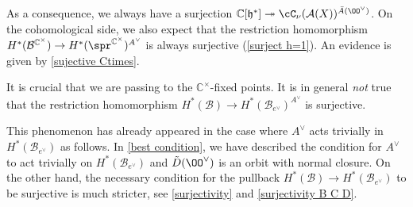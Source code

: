 \documentclass[12pt]{amsart}
\begin{document}
    As a consequence, we always have a surjection $\mathbb{C}[\mathfrak{h}^*] \twoheadrightarrow \cC_\nu(\mathcal{A}(X))^{\Bar{A}(\OO^\vee)}$. On the cohomological side, we also expect that the restriction homomorphism $H^*(\mathcal{B}^{\mathbb{C}^\times}) \rightarrow H^*(\spr^{\mathbb{C}^\times})^{A^\vee}$ is always surjective (\cref{surject h=1}). An evidence is given by \cref{sujective Ctimes}. %

\begin{warning}\label{warning_nonsurj_A_inv} %
It is crucial that we are passing to the $\mathbb{C}^\times$-fixed points. It is in general {\emph{not}} true that the restriction homomorphism $H^*(\mathcal{B}) \rightarrow H^*(\mathcal{B}_{e^\vee})^{A^\vee}$ is surjective. 

This phenomenon has already appeared in the case where $A^\vee$ acts trivially in $H^*(\mathcal{B}_{e^\vee})$ as follows. In \cref{best condition}, we have described the condition for $A^\vee$ to act trivially on $H^*(\mathcal{B}_{e^\vee})$ and $\Tilde{D}(\OO^\vee)$ is an orbit with normal closure. On the other hand, the necessary condition for the pullback $H^*(\mathcal{B}) \rightarrow H^*(\mathcal{B}_{e^\vee})$ to be surjective is much stricter, see \cref{surjectivity} and \cref{surjectivity B C D}. %


\end{warning}
\end{document}
